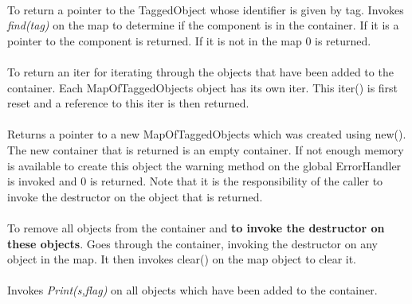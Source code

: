 \\
To return a pointer to the TaggedObject whose identifier is given by
\p tag. Invokes {\em find(tag)} on the map to determine if the
component is in the container. If it is a pointer to the component is
returned. If it is not in the map $0$ is returned. \\

\\
To return an iter for iterating through the objects that have been
added to the container. Each MapOfTaggedObjects object has its own iter. This
iter() is first reset and a reference to this iter is then returned.\\ 

\\
Returns a pointer to a new MapOfTaggedObjects which was created using
new(). The new container that is returned is an empty container.
If not enough memory is available to create this object the warning
method on the global ErrorHandler is invoked and $0$ is returned.
Note that it is the responsibility of the caller to invoke the destructor on the
object that is returned. \\


\\
To remove all objects from the container and {\bf to invoke the
destructor on these objects}. Goes through the container, invoking the
destructor on any object in the map. It then invokes clear() on
the map object to clear it. \\

\\
Invokes {\em Print(s,flag)} on all objects which have been added to
the container. 







